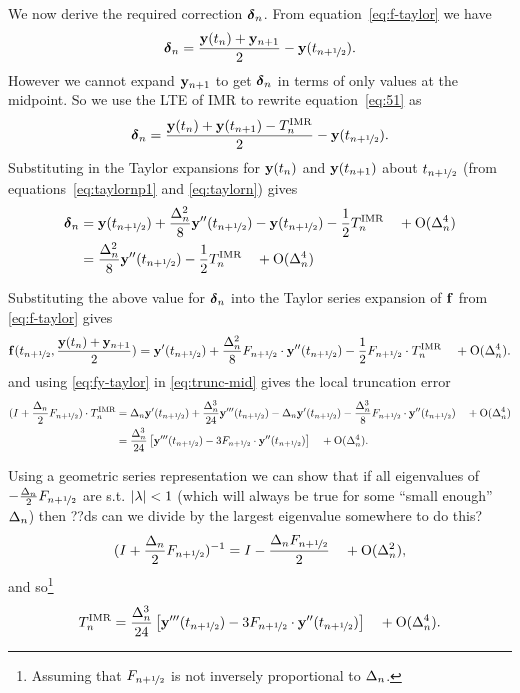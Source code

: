 We now derive the required correction $\dyn$.
From equation~\eqref{eq:f-taylor} we have
\begin{equation}
  \dyn = \frac{\yv(t_n) + \yv_{n+1}}{2} - \yvhf.
  \label{eq:51}
\end{equation}
However we cannot expand $\yv_{n+1}$ to get $\dyn$ in terms of only values at the midpoint.
So we use the LTE of IMR to rewrite equation~\eqref{eq:51} as
\begin{equation}
  \dyn = \frac{\yv(t_n) + \yv(t_{n+1}) - \lte^\IMP}{2} - \yvhf.
\end{equation}
Substituting in the Taylor expansions for $\yv(t_n)$ and $\yv(t_{n+1})$ about $\thf$ (from equations~\eqref{eq:taylornp1} and \eqref{eq:taylorn}) gives
\begin{align}
  \dyn &= \yvhf + \frac{\dtn^2}{8} \yvhf[''] - \yvhf - \frac{1}{2} \lte^\IMP \porder{\dtn^4} \notag\\
  &= \frac{\dtn^2}{8} \yvhf[''] - \frac{1}{2} \lte^\IMP \porder{\dtn^4}
  \label{eq:dy-value}
\end{align}



Substituting the above value for $\dyn$ into the Taylor series expansion of $\fv$ from \eqref{eq:f-taylor} gives
\begin{equation}
  \fv(\thf, \frac{\yv(t_n) + \yv_{n+1}}{2}) = \yvhf[']
  + \frac{\dtn^2}{8} \dfdyhf \cdot \yvhf[''] - \frac{1}{2} \dfdyhf \cdot \lte^\IMP \porder{\dtn^4}
  . \label{eq:fy-taylor}
\end{equation}
and using \eqref{eq:fy-taylor} in \eqref{eq:trunc-mid} gives the local truncation error
\begin{align}
  (I + \frac{\dtn}{2}\dfdyhf) \cdot\lte^\IMP
  &= \dtn \yvhf['] + \frac{\dtn^3}{24} \yvhf[''']
  - \dtn \yvhf[']
  - \frac{\dtn^3}{8} \dfdyhf \cdot \yvhf[''] \porder{\dtn^4}
  \notag \\
  &= \frac{\dtn^3}{24} \left[\yvhf['''] - 3 \dfdyhf \cdot \yvhf[''] \right]
  \porder{\dtn^4}.
  \label{eq:trunc-implicit-form}
\end{align}

Using a geometric series representation we can show that if all eigenvalues of  $-\frac{\dtn}{2}\dfdyhf$ are s.t. $\abs{\lambda} < 1$\cite{??ds} (which will always be true for some ``small enough'' $\dtn$) then
??ds can we divide by the largest eigenvalue somewhere to do this?
\begin{equation}
  (I + \frac{\dtn}{2}\dfdyhf)^{-1} = I - \frac{\dtn \dfdyhf}{2}  \porder{\dtn^2},
\end{equation}
and so\footnote{Assuming that $\dfdyhf$ is not inversely proportional to $\dtn$.}
\begin{equation}
  \lte^\IMP = \frac{\dtn^3}{24} \left[\yvhf['''] - 3 \dfdyhf \cdot \yvhf[''] \right]
  \quad +\order{\dtn^4}.
  \label{eq:trunc-final}
\end{equation}


